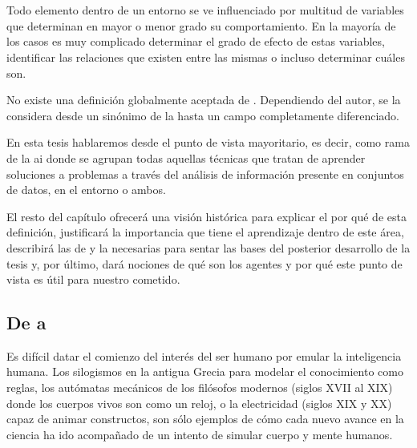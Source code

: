 \chapter{}
\label{ch:sota-ci}

Todo elemento dentro de un entorno se ve influenciado por multitud de variables que determinan en mayor o menor grado su comportamiento. En la mayoría de los casos es muy complicado determinar el grado de efecto de estas variables, identificar las relaciones que existen entre las mismas o incluso determinar cuáles son.

No existe una definición globalmente aceptada de . Dependiendo del autor, se la considera desde un sinónimo de la  hasta un campo completamente diferenciado.

En esta tesis hablaremos desde el punto de vista mayoritario, es decir, como rama de la \acrshort{ai} donde se agrupan todas aquellas técnicas que tratan de aprender soluciones a problemas a través del análisis de información presente en conjuntos de datos, en el entorno o ambos.

El resto del capítulo ofrecerá una visión histórica para explicar el por qué de esta definición, justificará la importancia que tiene el aprendizaje dentro de este área, describirá las de  y la  necesarias para sentar las bases del posterior desarrollo de la tesis y, por último, dará nociones de qué son los agentes y por qué este punto de vista es útil para nuestro cometido.

\section{De  a }

Es difícil datar el comienzo del interés del ser humano por emular la inteligencia humana. Los silogismos en la antigua Grecia para modelar el conocimiento como reglas, los autómatas mecánicos de los filósofos modernos (siglos XVII al XIX) donde los cuerpos vivos son como un reloj, o la electricidad (siglos XIX y XX) capaz de animar constructos, son sólo ejemplos de cómo cada nuevo avance en la ciencia ha ido acompañado de un intento de simular cuerpo y mente humanos.

